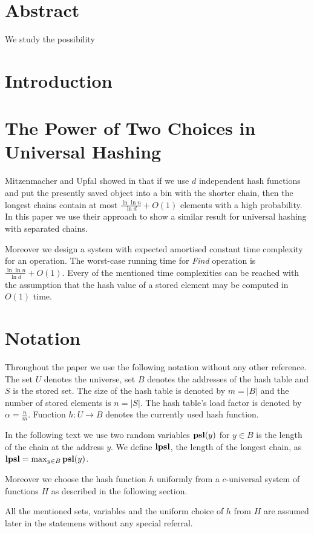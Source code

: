 \section{Abstract}
We study the possibility 

\section{Introduction}

\section{The Power of Two Choices in Universal Hashing}

Mitzenmacher and Upfal showed in \cite{1076315} that if we use $d$ independent hash functions and put the presently saved object into a bin with the shorter chain, then the longest chains contain at most $\frac{\ln \ln n}{\ln d} + O(1)$ elements with a high probability. In this paper we use their approach to show a similar result for universal hashing with separated chains.

Moreover we design a system with expected amortised constant time complexity for an operation. The worst-case running time for \emph{Find} operation is $\frac{\ln \ln n}{\ln d} + O(1)$. Every of the mentioned time complexities can be reached with the assumption that the hash value of a stored element may be computed in $O(1)$ time.

\section{Notation}
Throughout the paper we use the following notation without any other reference. The set $U$ denotes the universe, set $B$ denotes the addresses of the hash table and $S$ is the stored set. The size of the hash table is denoted by $m = |B|$ and the number of stored elements is $n = |S|$. The hash table's load factor is denoted by $\alpha = \frac{n}{m}$. Function $h: U \rightarrow B$ denotes the currently used hash function.

In the following text we use two random variables $\mathbf{psl}(y)$ for $y \in B$ is the length of the chain at the address $y$. We define $\mathbf{lpsl}$, the length of the longest chain, as $\mathbf{lpsl} = \max_{y \in B} \mathbf{psl}(y)$. 

Moreover we choose the hash function $h$ uniformly from a $c$-universal system of functions $H$ as described in the following section. 

All the mentioned sets, variables and the uniform choice of $h$ from $H$ are assumed later in the statemens without any special referral.

